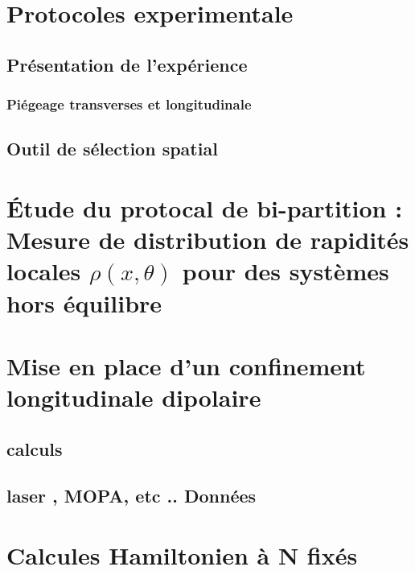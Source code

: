 \chapter{Protocoles experimentale}
\minitoc
\section{Présentation de l’expérience}

\subsection{Piégeage transverses et longitudinale}
\section{Outil de sélection spatial}


\chapter{Étude du protocal de bi-partition : Mesure de distribution de rapidités locales $\rho(x , \theta ) $  pour des systèmes hors équilibre}
\minitoc


\chapter{Mise en place d'un confinement longitudinale dipolaire}
\minitoc
\section{calculs}
\section{laser , MOPA, etc .. Données}

\appendix

\chapter{Calcules Hamiltonien à N fixés}
